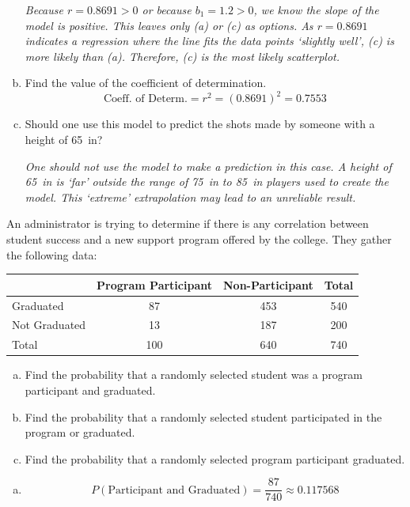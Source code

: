 \documentclass[12pt,letterpaper]{exam}
\begin{document}
\begin{questions}
\begin{enumerate}[(a)]
	{\itshape Because $r= 0.8691 > 0$ or because $b_1= 1.2 > 0$, we know the slope of the model is positive. This leaves only (a) or (c) as options. As $r= 0.8691$ indicates a regression where the line fits the data points `slightly well', (c) is more likely than (a). Therefore, (c) is the most likely scatterplot.}
	
	\item Find the value of the coefficient of determination. \pspace
		\[
		\text{Coeff. of Determ.}= r^2= (0.8691)^2= 0.7553
		\] \pvspace{0.8cm}
	
	\item Should one use this model to predict the shots made by someone with a height of 65~in?	\pspace
	
	{\itshape One should not use the model to make a prediction in this case. A height of 65~in is `far' outside the range of 75~in to 85~in players used to create the model. This `extreme' extrapolation may lead to an unreliable result.}
	\end{enumerate}



\newpage
\question[10] An administrator is trying to determine if there is any correlation between student success and a new support program offered by the college. They gather the following data:
	\begin{table}[!ht]
	\centering
	\begin{tabular}{|l||c|c|c|} \hline
	& Program Participant & Non-Participant & Total \\ \hline \hline
	Graduated & 87 & 453 & 540 \\ \hline
	Not Graduated & 13 & 187 & 200 \\ \hline \hline
	Total & 100 & 640 & 740 \\ \hline
	\end{tabular}
	\end{table}

\begin{enumerate}[(a)]
\item Find the probability that a randomly selected student was a program participant and graduated.
\item Find the probability that a randomly selected student participated in the program or graduated. 
\item Find the probability that a randomly selected program participant graduated. 
\end{enumerate} \pspace

{\itshape
\sol  
\begin{enumerate}[(a)]
\item 
	\[
	P(\text{Participant and Graduated})= \dfrac{87}{740} \approx 0.117568
	\] \pspace


\end{enumerate}}
\end{questions}
\end{document}
